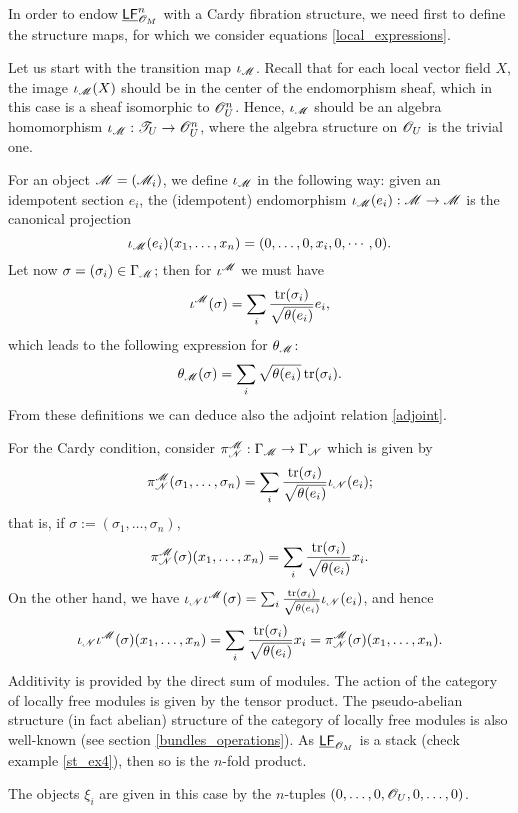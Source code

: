 In order to endow $\underline{\mathsf{LF}}^n_{\mathscr{O}_M}$ with a Cardy fibration structure, we need first to define the structure maps, for which we consider equations \eqref{local_expressions}.

Let us start with the transition map $\iota_\mathscr{M}$. Recall that for each local vector field $X$, the image $\iota_\mathscr{M}(X)$ should be in the center of the endomorphism sheaf, which in this case is a sheaf isomorphic to $\mathscr{O}^n_U$. Hence, $\iota_\mathscr{M}$ should be an algebra homomorphism $\iota_\mathscr{M}:\mathscr{T}_U\to \mathscr{O}^n_U$, where the algebra structure on $\mathscr{O}_U$ is the trivial one.

For an object $\mathscr{M}=(\mathscr{M}_i)$, we define $\iota_{\mathscr{M}}$ in the following way: given an idempotent section $e_i$, the (idempotent) endomorphism $\iota_{\mathscr{M}}(e_i):\mathscr{M}\to \mathscr{M}$ is the canonical projection
$$\iota_{\mathscr{M}}(e_i)(x_1,\dots ,x_n)=(0,\dots ,0,x_i,0,\cdots ,0).$$
Let now $\sigma =(\sigma_i)\in \Gamma_{\mathscr{M}}$; then for $\iota^\mathscr{M}$ we must have
$$\iota^\mathscr{M}(\sigma )= \sum_i\frac{\operatorname{tr}(\sigma_i)}{\sqrt{\theta (e_i)}}e_i,$$
which leads to the following expression for $\theta_\mathscr{M}$:
$$\theta_\mathscr{M}(\sigma )=\sum_i\sqrt{\theta (e_i)}\operatorname{tr}(\sigma_i).$$
From these definitions we can deduce also the adjoint relation \eqref{adjoint}.

For the Cardy condition, consider $\pi^\mathscr{M}_\mathscr{N}:\Gamma_{\mathscr{M}}\to \Gamma_{\mathscr{N}}$ which is given by
$$\pi_\mathscr{N}^\mathscr{M}(\sigma_1,\dots ,\sigma_n)=\sum_i\frac{\operatorname{tr}(\sigma_i)}{\sqrt{\theta (e_i)}}\iota_\mathscr{N}(e_i);$$
that is, if $\sigma :=(\sigma_1,\dots ,\sigma_n)$,
$$\pi_\mathscr{N}^\mathscr{M}(\sigma )(x_1,\dots ,x_n)=\sum_i\frac{\operatorname{tr}(\sigma_i)}{\sqrt{\theta (e_i)}}x_i.$$
On the other hand, we have $\iota_\mathscr{N}\iota^\mathscr{M}(\sigma )=\sum_i\frac{\operatorname{tr}(\sigma_i)}{\sqrt{\theta (e_i)}}\iota_\mathscr{N}(e_i)$, and hence
$$\iota_\mathscr{N}\iota^\mathscr{M}(\sigma )(x_1,\dots ,x_n)=\sum_i\frac{\operatorname{tr}(\sigma_i)}{\sqrt{\theta (e_i)}}x_i=\pi_\mathscr{N}^\mathscr{M}(\sigma )(x_1,\dots ,x_n).$$
Additivity is provided by the direct sum of modules. The action of the category of locally free modules is given by the tensor product. The pseudo-abelian structure (in fact abelian) structure of the category of locally free modules is also well-known (see section \ref{bundles_operations}). As $\underline{\mathsf{LF}}_{\mathscr{O}_M}$ is a stack (check example \ref{st_ex4}), then so is the $n$-fold product.

The objects $\xi_i$ are given in this case by the $n$-tuples $(0,\dots ,0,\mathscr{O}_U,0,\dots ,0)$.

